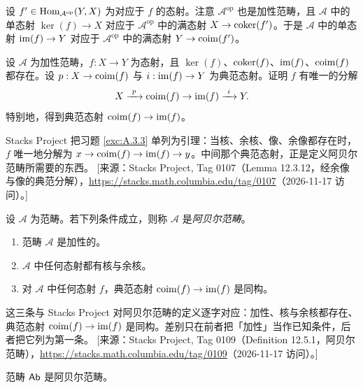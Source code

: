 \begin{remark}\label{rem:A.3.2}
设 $f'\in\operatorname{Hom}_{\mathcal{A}^{\mathrm{op}}}(Y,X)$ 为对应于 $f$ 的态射。注意 $\mathcal{A}^{\mathrm{op}}$ 也是加性范畴，且 $\mathcal{A}$ 中的单态射 $\ker(f)\to X$ 对应于 $\mathcal{A}^{\mathrm{op}}$ 中的满态射 $X\to\operatorname{coker}(f')$。于是 $\mathcal{A}$ 中的单态射 $\operatorname{im}(f)\to Y$ 对应于 $\mathcal{A}^{\mathrm{op}}$ 中的满态射 $Y\to\operatorname{coim}(f')$。
\end{remark}

\begin{exercise}\label{exc:A.3.3}
设 $\mathcal{A}$ 为加性范畴，$f:X\to Y$ 为态射，且 $\ker(f)$、$\operatorname{coker}(f)$、$\operatorname{im}(f)$、$\operatorname{coim}(f)$ 都存在。设 $p:X\to\operatorname{coim}(f)$ 与 $i:\operatorname{im}(f)\to Y$ 为典范态射。证明 $f$ 有唯一的分解
\[
X\xrightarrow{\ p\ }\coim(f)\to\im(f)\xrightarrow{\ i\ }Y.
\]
特别地，得到典范态射 $\operatorname{coim}(f)\to\operatorname{im}(f)$。
\end{exercise}

\begin{yizhu}
Stacks Project 把习题 \ref{exc:A.3.3} 单列为引理：当核、余核、像、余像都存在时，$f$ 唯一地分解为 $x\to\operatorname{coim}(f)\to\operatorname{im}(f)\to y$。中间那个典范态射，正是定义阿贝尔范畴所需要的东西。
[来源：Stacks Project, Tag 0107（Lemma 12.3.12，经余像与像的典范分解），\url{https://stacks.math.columbia.edu/tag/0107}（2026-11-17 访问）。]
\end{yizhu}

\begin{definition}\label{def:A.3.4}
设 $\mathcal{A}$ 为范畴。若下列条件成立，则称 $\mathcal{A}$ 是\emph{阿贝尔范畴}。
\begin{enumerate}[label=(\roman*),leftmargin=2em,itemsep=0.25ex]
  \item 范畴 $\mathcal{A}$ 是加性的。
  \item $\mathcal{A}$ 中任何态射都有核与余核。
  \item 对 $\mathcal{A}$ 中任何态射 $f$，典范态射 $\operatorname{coim}(f)\to\operatorname{im}(f)$ 是同构。
\end{enumerate}
\end{definition}

\begin{yizhu}
这三条与 Stacks Project 对阿贝尔范畴的定义逐字对应：加性、核与余核都存在、典范态射 $\operatorname{coim}(f)\to\operatorname{im}(f)$ 是同构。差别只在前者把「加性」当作已知条件，后者把它列为第一条。
[来源：Stacks Project, Tag 0109（Definition 12.5.1，阿贝尔范畴），\url{https://stacks.math.columbia.edu/tag/0109}（2026-11-17 访问）。]
\end{yizhu}

\begin{example}\label{ex:A.3.5}
范畴 $\mathsf{Ab}$ 是阿贝尔范畴。
\end{example}

